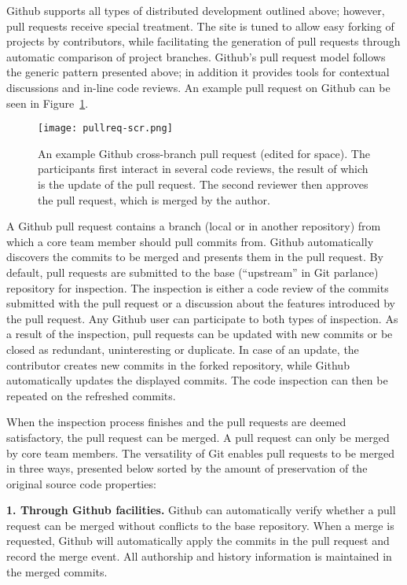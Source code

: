 \documentclass{sig-alternate}
\begin{document}
Github supports all types of distributed development outlined above; however,
pull requests receive special treatment. The site is tuned to allow easy forking
of projects by contributors, while facilitating the generation of pull requests
through automatic comparison of project branches.
Github's pull request model follows the generic pattern presented above; in
addition it provides tools for contextual discussions and in-line code reviews.
An example pull request on Github can be seen in Figure~\ref{fig:pullreq-scr}.

\begin{figure}[t]
  \centering
   \texttt{[image: pullreq-scr.png]}
   \caption{An example Github cross-branch pull request (edited for space). The
   participants first interact in several code reviews, the result of which is
   the update of the pull request. The second reviewer then approves the pull
   request, which is merged by the author.}
   \label{fig:pullreq-scr}
\end{figure}

A Github pull request contains a branch (local or in another repository) from
which a core team member should pull commits from. Github automatically
discovers the commits to be merged and presents them in the pull request. By
default, pull requests are submitted to the base (``upstream'' in Git parlance)
repository for inspection. The
inspection is either a code review of the commits submitted with the pull
request or a discussion about the features introduced by the pull request. Any
Github user can participate to both types of inspection. As a result of the
inspection, pull requests can be updated with new commits or be closed as
redundant, uninteresting or duplicate. In case of an update, the contributor
creates new commits in the forked repository, while Github automatically
updates the displayed commits. The code inspection can then be repeated on the
refreshed commits.

When the inspection process finishes and the pull requests are deemed
satisfactory, the pull request can be merged. A pull request can only be merged
by core team members. The versatility of Git enables pull requests to be
merged in three ways, presented below sorted by the amount of preservation of
the original source code properties:

\textbf{1. Through Github facilities.}
    Github can automatically verify whether a
    pull request can be merged without conflicts to the base repository. When a
    merge is requested, Github will automatically apply the commits in the pull
    request and record the merge event. All authorship and history information
    is maintained in the merged commits.
\end{document}
